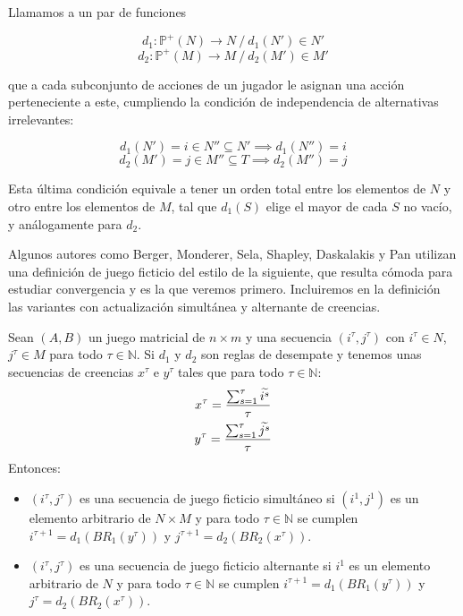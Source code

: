 \begin{definition} \label{def:reglas:desempate}
    Llamamos  a un par de funciones
    
    \[ d_1: \mathbb{P}^+(N) \rightarrow N \ / \ d_1(N') \in N' \]
    \[ d_2: \mathbb{P}^+(M) \rightarrow M \ / \ d_2(M') \in M' \]
    
    que a cada subconjunto de acciones de un jugador le asignan una acción perteneciente a este, cumpliendo la condición de independencia de alternativas irrelevantes:

    \[ d_1(N') = i \in N'' \subseteq N' \implies  d_1(N'') = i \]
    \[ d_2(M') = j \in M'' \subseteq T  \implies  d_2(M'') = j \]

Esta última condición equivale a tener un orden total entre los elementos de $N$ y otro entre los elementos de $M$, tal que $d_1(S)$ elige el mayor de cada $S$ no vacío, y análogamente para $d_2$. 
\end{definition}

Algunos autores como Berger, Monderer, Sela, Shapley, Daskalakis y Pan \cite{browns:original} \cite{no:cycling} \cite{2x2:without} \cite{identical:interests} \cite{counter:karlin:strong} utilizan una definición de juego ficticio del estilo de la siguiente, que resulta cómoda para estudiar convergencia y es la que veremos primero. Incluiremos en la definición las variantes con actualización simultánea y alternante de creencias.

\begin{definition} \label{def:fp:berger}
    Sean $(A, B)$ un juego matricial de $n \times m$ y una secuencia $(i^\tau, j^\tau)$ con $i^\tau \in N$, $j^\tau \in M$ para todo $\tau \in \mathbb{N}$. Si $d_1$ y $d_2$ son reglas de desempate y tenemos unas secuencias de creencias $x^\tau$ e $y^\tau$ tales que para todo $\tau \in \mathbb{N}$:
    \begin{gather*}
        x^\tau= \frac{\sum^\tau_{s=1} \widetilde{i^s}}{\tau}  \\
        y^\tau= \frac{\sum^\tau_{s=1} \widetilde{j^s}}{\tau}
    \end{gather*}
    Entonces:
    \begin{itemize}
        \item $(i^\tau, j^\tau)$ es una secuencia de juego ficticio simultáneo si $(i^1, j^1)$ es un elemento arbitrario de $N \times M$ y para todo $\tau \in \mathbb{N}$ se cumplen $i^{\tau+1} = d_1(BR_1(y^\tau))$ y $j^{\tau+1} = d_2(BR_2(x^\tau))$.
        \item $(i^\tau, j^\tau)$ es una secuencia de juego ficticio alternante si $i^1$ es un elemento arbitrario de $N$ y para todo $\tau \in \mathbb{N}$ se cumplen $i^{\tau+1} = d_1(BR_1(y^\tau))$ y $j^{\tau} = d_2(BR_2(x^\tau))$.
    \end{itemize}
\end{definition}

